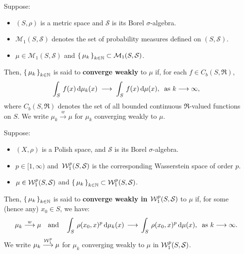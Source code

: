 \begin{definition}
\mbox{}\vskip 0.1cm
\noindent
Suppose:
\begin{itemize}
\item $\left(S,\rho\right)$ is a metric space and $\mathcal{S}$ is its Borel $\sigma$-algebra.
\item $\mathcal{M}_{1}\!\left(S,\mathcal{S}\right)$ denotes the set of probability measures defined on $\left(S,\mathcal{S}\right)$.
\item $\mu \in \mathcal{M}_{1}\!\left(S,\mathcal{S}\right)$ and
	$\left\{\,\mu_{k}\,\right\}_{k\in\mathbb{N}} \subset \mathcal{M}_{1}\!\left(S,\mathcal{S}\right)$.
\end{itemize}
Then, $\left\{\,\mu_{k}\,\right\}_{k\in\mathbb{N}}$ is said to
\textbf{converge weakly} to $\mu$ if, for each $f \in C_{b}(S,\Re)$,
\begin{equation*}
\int_{S}\,f(x)\,\textnormal{d}\mu_{k}(x) \;\longrightarrow\;\int_{S}\,f(x)\,\textnormal{d}\mu(x),
\;\;\textnormal{as $k \longrightarrow \infty$},
\end{equation*}
where $C_{b}(S,\Re)$ denotes the set of all bounded continuous $\Re$-valued functions on $S$.
We write $\mu_{k}\overset{w}{\longrightarrow}\mu$ for $\mu_{k}$ converging weakly to $\mu$.
\end{definition}

\begin{definition}
\mbox{}\vskip 0.1cm
\noindent
Suppose:
\begin{itemize}
\item $(X, \rho)$ is a Polish space, and $\mathcal{S}$ is its Borel $\sigma$-algebra.
\item $p \in [1,\infty)$ and\,
	$\mathcal{W}^{p}_{1}\!\left(S,\mathcal{S}\right)$ is the corresponding Wasserstein space of order $p$.
\item $\mu \in \mathcal{W}^{p}_{1}\!\left(S,\mathcal{S}\right)$ and
	$\left\{\,\mu_{k}\,\right\}_{k\in\mathbb{N}} \subset \mathcal{W}^{p}_{1}\!\left(S,\mathcal{S}\right)$.
\end{itemize}
Then, $\left\{\,\mu_{k}\,\right\}_{k\in\mathbb{N}}$ is said to
\textbf{converge weakly in $\mathcal{W}^{p}_{1}\!\left(S,\mathcal{S}\right)$} to $\mu$
if, for some (hence any) $x_{0} \in S$, we have:
\begin{equation*}
\mu_{k} \overset{w}{\longrightarrow} \mu
\quad\textnormal{and}\quad
\int_{S}\, \rho(x_{0},x)^{p}\,\textnormal{d}\mu_{k}(x) \,\longrightarrow\,\int_{S}\, \rho(x_{0},x)^{p}\,\textnormal{d}\mu(x),
\;\;\textnormal{as $k \longrightarrow \infty$}.
\end{equation*}
We write $\mu_{k} \overset{\mathcal{W}^{p}_{1}}{\longrightarrow} \mu$
for $\mu_{k}$ converging weakly to $\mu$ in $\mathcal{W}^{p}_{1}\!\left(S,\mathcal{S}\right)$.
\end{definition}

